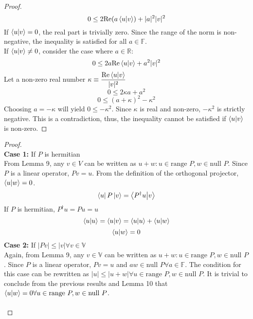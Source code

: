 \begin{sol}
\begin{enumerate}[label=\textbf{(\alph*)}]
\begin{proof}
\begin{equation}
	0\leq 2\text{Re}(a\braket{u}{v})+|a|^2|v|^2
\end{equation} 
If $\braket{u}{v}=0$, the real part is trivially zero. Since the range of the norm is non-negative, the inequality is satisfied for all $a\in\mathbb F$.\\
If $\braket{u}{v}\neq 0$, consider the case where $a\in\mathbb R$:
\begin{equation}
	0\leq 2a\text{Re}\braket{u}{v}+a^2|v|^2
\end{equation} 
Let a non-zero real number $\displaystyle{\kappa\equiv\frac{\text{Re}\braket{u}{v}}{|v|^2}}$ 
\begin{equation}
	0\leq 2\kappa a+a^2
\end{equation} 
\begin{equation}
	0\leq (a+\kappa)^2-\kappa^2
\end{equation} 
Choosing $a=-\kappa$ will yield $0\leq-\kappa^2$. Since $\kappa$ is real and non-zero, $-\kappa^2$ is strictly negative. This is a contradiction, thus, the inequality cannot be satisfied if $\braket{u}{v}$ is non-zero.
\end{proof}
\begin{proof}\,\\
\textbf{Case 1:} If $P$ is hermitian\\
From Lemma 9, any $v\in V$ can be written as $u+w:u\in \text{range }P,w\in\text{null }P$. Since $P$ is a linear operator, $Pv=u$. From the definition of the orthogonal projector, $\braket{u}{w}=0$.\\
\begin{equation}
	\bra u P\ket v=\braket{P^\dagger u}{v}
\end{equation} 
If $P$ is hermitian, $P^\dagger u=Pu=u$ 
\begin{equation}
	\braket{u}{u}=\braket{u}{v}=\braket{u}{u}+\braket{u}{w}
\end{equation}
\begin{equation}
	\braket{u}{w}=0
\end{equation} 
\textbf{Case 2:} If $|Pv|\leq|v|\forall v\in\mathbb V$\\
Again, from Lemma 9, any $v\in \mathbb V$ can be written as $u+w:u\in \text{range }P,w\in\text{null }P$. Since $P$ is a linear operator, $Pv=u$ and $aw\in\text{null }P\forall a\in\mathbb F$. The condition for this case can be rewritten as $|u|\leq|u+w|\forall u\in \text{range }P,w\in\text{null }P$. It is trivial to conclude from the previous results and Lemma 10 that $\braket{u}{w}=0\forall u\in \text{range }P,w\in\text{null }P$.\\\\

\end{proof}
\end{enumerate}
\end{sol}
